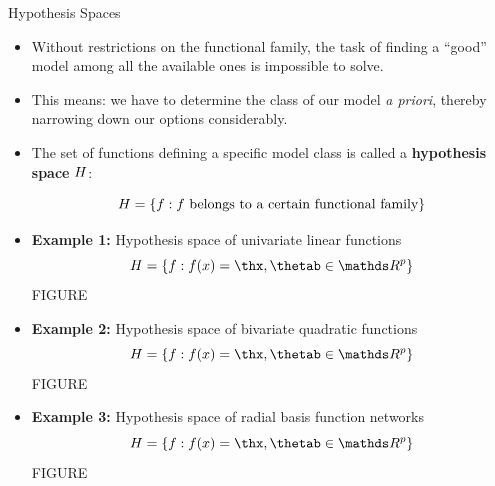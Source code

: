 \documentclass[11pt,compress,t,notes=noshow, xcolor=table]{beamer}
\begin{document}

\begin{vbframe}{Hypothesis Spaces}

\begin{itemize}

  \item Without restrictions on the functional family, the task of finding a 
  \enquote{good} model among all the available ones is impossible to solve.
  
  \item This means: we have to determine the class of our model \emph{a priori}, 
  thereby narrowing down our options considerably.
  
  \item The set of functions defining a specific model class is called a 
  \textbf{hypothesis space} $H$:
  
  $$H = \{f: f \text{ belongs to a certain functional family}\}$$
  
  \framebreak
  
  \item \textbf{Example 1:} Hypothesis space of univariate linear functions
  $$\Hspace = \{f: \fx =  \thx, \thetab \in \R^p\}$$
  \color{red} {FIGURE}
  \color{black}
  
  \item \textbf{Example 2:} Hypothesis space of bivariate quadratic functions
  $$\Hspace = \{f: \fx =  \thx, \thetab \in \R^p\}$$
  \color{red} {FIGURE}
  \color{black}
  
  \item \textbf{Example 3:} Hypothesis space of radial basis function networks
  $$\Hspace = \{f: \fx =  \thx, \thetab \in \R^p\}$$
  \color{red} {FIGURE}
  \color{black}

\end{itemize}  

\end{vbframe}

\end{document}
